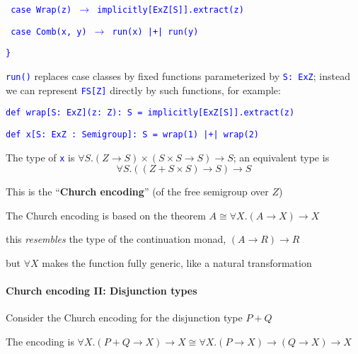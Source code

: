 \texttt{\textcolor{blue}{\footnotesize{}  case Wrap(z) $\rightarrow$
implicitly{[}ExZ{[}S{]}{]}.extract(z)}}{\footnotesize\par}

\texttt{\textcolor{blue}{\footnotesize{}  case Comb(x, y) $\rightarrow$
run(x) |+| run(y)}}{\footnotesize\par}

\texttt{\textcolor{blue}{\footnotesize{}\}}}{\footnotesize\par}

\texttt{\textcolor{blue}{\footnotesize{}run()}} replaces case classes
by fixed functions parameterized by \texttt{\textcolor{blue}{\footnotesize{}S:~ExZ}};
instead we can represent \texttt{\textcolor{blue}{\footnotesize{}FS{[}Z{]}}}
directly by such functions, for example:

\texttt{\textcolor{blue}{\footnotesize{}def wrap{[}S: ExZ{]}(z: Z): S
= implicitly{[}ExZ{[}S{]}{]}.extract(z)}}{\footnotesize\par}

\texttt{\textcolor{blue}{\footnotesize{}def x{[}S: ExZ : Semigroup{]}: S
= wrap(1) |+| wrap(2)}}{\footnotesize\par}

The type of \texttt{\textcolor{blue}{\footnotesize{}x}} is {\footnotesize{}$\forall S.\left(Z\rightarrow S\right)\times\left(S\times S\rightarrow S\right)\rightarrow S$};
an equivalent type is{\footnotesize{}
\[
\forall S.\left(\left(Z+S\times S\right)\rightarrow S\right)\rightarrow S
\]
}{\footnotesize\par}

This is the \textsf{``}\textbf{Church encoding}\textsf{''} (of the free semigroup
over $Z$)

The Church encoding is based on the theorem {\footnotesize{}$A\cong\forall X.\left(A\rightarrow X\right)\rightarrow X$} 

this \emph{resembles} the type of the continuation monad, $\left(A\rightarrow R\right)\rightarrow R$ 

but $\forall X$ makes the function fully generic, like a natural
transformation


\paragraph{Church encoding II: Disjunction types}

Consider the Church encoding for the disjunction type $P+Q$ 

The encoding is {\footnotesize{}$\forall X.\left(P+Q\rightarrow X\right)\rightarrow X\cong\forall X.\left(P\rightarrow X\right)\rightarrow\left(Q\rightarrow X\right)\rightarrow X$}{\footnotesize\par}

